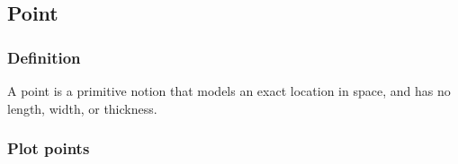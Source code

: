 \documentclass{article}
\begin{document}
\subsection{Point}
\subsubsection{Definition}
A point is a primitive notion that models an exact location in space, and has no length, width, or thickness. 

\subsubsection{Plot points}





\end{document}
